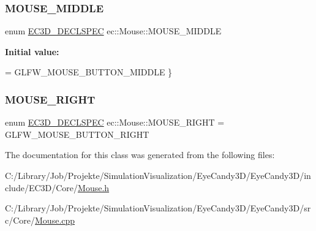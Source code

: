 \mbox{\label{classec_1_1_mouse_a0fbdf11d1d258a805821e37141f95131}} 
\subsubsection{\texorpdfstring{M\+O\+U\+S\+E\+\_\+\+M\+I\+D\+D\+LE}{MOUSE\_MIDDLE}}
{\footnotesize\ttfamily enum \mbox{\hyperlink{_common_8h_aac42573e202ca3dd4d259c81691e2369}{E\+C3\+D\+\_\+\+D\+E\+C\+L\+S\+P\+EC}} ec\+::\+Mouse\+::\+M\+O\+U\+S\+E\+\_\+\+M\+I\+D\+D\+LE}

{\bfseries Initial value\+:}
\begin{DoxyCode}
= GLFW\_MOUSE\_BUTTON\_MIDDLE
        \}
\end{DoxyCode}
\mbox{\label{classec_1_1_mouse_a433aac3a68d060b7f330976e5855ddad}} 
\subsubsection{\texorpdfstring{M\+O\+U\+S\+E\+\_\+\+R\+I\+G\+HT}{MOUSE\_RIGHT}}
{\footnotesize\ttfamily enum \mbox{\hyperlink{_common_8h_aac42573e202ca3dd4d259c81691e2369}{E\+C3\+D\+\_\+\+D\+E\+C\+L\+S\+P\+EC}} ec\+::\+Mouse\+::\+M\+O\+U\+S\+E\+\_\+\+R\+I\+G\+HT = G\+L\+F\+W\+\_\+\+M\+O\+U\+S\+E\+\_\+\+B\+U\+T\+T\+O\+N\+\_\+\+R\+I\+G\+HT}



The documentation for this class was generated from the following files\+:\begin{DoxyCompactItemize}
\item 
C\+:/\+Library/\+Job/\+Projekte/\+Simulation\+Visualization/\+Eye\+Candy3\+D/\+Eye\+Candy3\+D/include/\+E\+C3\+D/\+Core/\mbox{\hyperlink{_mouse_8h}{Mouse.\+h}}\item 
C\+:/\+Library/\+Job/\+Projekte/\+Simulation\+Visualization/\+Eye\+Candy3\+D/\+Eye\+Candy3\+D/src/\+Core/\mbox{\hyperlink{_mouse_8cpp}{Mouse.\+cpp}}\end{DoxyCompactItemize}
